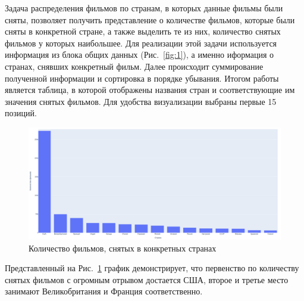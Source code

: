 Задача распределения фильмов по странам, в которых данные фильмы были сняты, позволяет получить представление о количестве фильмов, которые были сняты в конкретной стране, а также выделить те из них, количество снятых фильмов у которых наибольшее. 
Для реализации этой задачи используется информация из блока общих данных (Рис.~\ref{fig:1}), а именно иформация о странах, снявших конкретный фильм. Далее происходит суммирование полученной информации и сортировка в порядке убывания. 
Итогом работы является таблица, в которой отображены названия стран и соответствующие им значения снятых фильмов.
Для удобства визуализации выбраны первые 15 позиций.

\begin{figure}[ht!]
	\includegraphics[width=\linewidth]{../report/images/films_by_country/2}
	\caption{Количество фильмов, снятых в конкретных странах}
	\label{fig:films_by_country_task}
\end{figure}

Представленный на Рис.~\ref{fig:films_by_country_task} график демонстрирует, что первенство по количеству снятых фильмов с огромным отрывом достается США, второе и третье место занимают Великобритания и Франция соответственно.